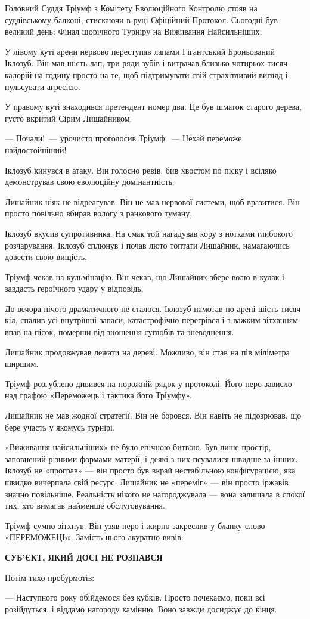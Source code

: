 \documentclass[12pt, a4paper, openany]{book}
\begin{document}
\begin{terrybox}
Головний Суддя Тріумф з Комітету Еволюційного Контролю стояв на суддівському балконі, стискаючи в руці Офіційний Протокол. Сьогодні був великий день: Фінал щорічного Турніру на Виживання Найсильніших.

У лівому куті арени нервово переступав лапами Гігантський Броньований Іклозуб. Він мав шість лап, три ряди зубів і витрачав близько чотирьох тисяч калорій на годину просто на те, щоб підтримувати свій страхітливий вигляд і пульсувати агресією.

У правому куті знаходився претендент номер два. Це був шматок старого дерева, густо вкритий Сірим Лишайником.

--- Почали!~--- урочисто проголосив Тріумф.~--- Нехай переможе найдостойніший!

Іклозуб кинувся в атаку. Він голосно ревів, бив хвостом по піску і всіляко демонстрував свою еволюційну домінантність.

Лишайник ніяк не відреагував. Він не мав нервової системи, щоб вразитися. Він просто повільно вбирав вологу з ранкового туману.

Іклозуб вкусив супротивника. На смак той нагадував кору з нотками глибокого розчарування. Іклозуб сплюнув і почав люто топтати Лишайник, намагаючись довести свою вищість.

Тріумф чекав на кульмінацію. Він чекав, що Лишайник збере волю в кулак і завдасть героїчного удару у відповідь.

До вечора нічого драматичного не сталося. Іклозуб намотав по арені шість тисяч кіл, спалив усі внутрішні запаси, катастрофічно перегрівся і з важким зітханням впав на пісок, померши від зношення суглобів та зневоднення.

Лишайник продовжував лежати на дереві. Можливо, він став на пів міліметра ширшим.

\medskip
Тріумф розгублено дивився на порожній рядок у протоколі. Його перо зависло над графою «Переможець і тактика його Тріумфу».

Лишайник не мав жодної стратегії. Він не боровся. Він навіть не підозрював, що бере участь у якомусь турнірі.

«Виживання найсильніших» не було епічною битвою. Був лише простір, заповнений різними формами матерії, і деякі з них псувалися швидше за інших. Іклозуб не «програв» — він просто був вкрай нестабільною конфігурацією, яка швидко вичерпала свій ресурс. Лишайник не «переміг» — він просто іржавів значно повільніше. Реальність нікого не нагороджувала — вона залишала в спокої тих, хто вимагав найменше обслуговування.

Тріумф сумно зітхнув. Він узяв перо і жирно закреслив у бланку слово «ПЕРЕМОЖЕЦЬ». Замість нього акуратно вивів:

\medskip
\begin{center}\textbf{СУБ'ЄКТ, ЯКИЙ ДОСІ НЕ РОЗПАВСЯ}\end{center}

\medskip
Потім тихо пробурмотів:

--- Наступного року обійдемося без кубків. Просто почекаємо, поки всі розійдуться, і віддамо нагороду камінню. Воно завжди досиджує до кінця.
\end{terrybox}
\end{document}
